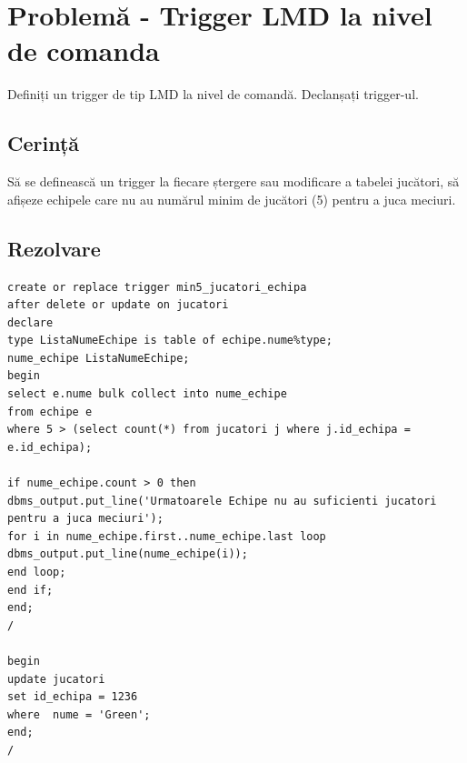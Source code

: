 \documentclass{article}
\begin{document}
\section{Problemă - Trigger LMD la nivel de comanda}
	Definiți un trigger de tip LMD la nivel de comandă. Declanșați trigger-ul.
	
\subsection{Cerință}
Să se definească un trigger la fiecare ștergere sau modificare a tabelei jucători, să afișeze echipele care nu au numărul minim de jucători (5) pentru a juca meciuri.
\subsection{Rezolvare}
\begin{lstlisting}
create or replace trigger min5_jucatori_echipa
after delete or update on jucatori
declare
type ListaNumeEchipe is table of echipe.nume%type;
nume_echipe ListaNumeEchipe;
begin
select e.nume bulk collect into nume_echipe
from echipe e 
where 5 > (select count(*) from jucatori j where j.id_echipa = e.id_echipa);

if nume_echipe.count > 0 then
dbms_output.put_line('Urmatoarele Echipe nu au suficienti jucatori pentru a juca meciuri');
for i in nume_echipe.first..nume_echipe.last loop
dbms_output.put_line(nume_echipe(i));
end loop;
end if;
end;
/

begin
update jucatori
set id_echipa = 1236
where  nume = 'Green';
end;
/


\end{lstlisting}
\end{document}
